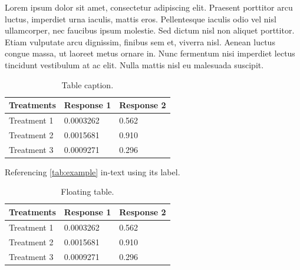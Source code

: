 \documentclass[
	11pt, %
	fleqn, %
	a4paper, %
]{LegrandOrangeBook}
\begin{document}
Lorem ipsum dolor sit amet, consectetur adipiscing elit. Praesent porttitor arcu luctus, imperdiet urna iaculis, mattis eros. Pellentesque iaculis odio vel nisl ullamcorper, nec faucibus ipsum molestie. Sed dictum nisl non aliquet porttitor. Etiam vulputate arcu dignissim, finibus sem et, viverra nisl. Aenean luctus congue massa, ut laoreet metus ornare in. Nunc fermentum nisi imperdiet lectus tincidunt vestibulum at ac elit. Nulla mattis nisl eu malesuada suscipit.

\begin{table}[H] %
	\centering %
	\begin{tabular}{L{0.15\textwidth} R{0.15\textwidth} R{0.15\textwidth}} %
		\toprule
		\textbf{Treatments} & \textbf{Response 1} & \textbf{Response 2} \\
		\midrule
		Treatment 1         & 0.0003262           & 0.562               \\
		Treatment 2         & 0.0015681           & 0.910               \\
		Treatment 3         & 0.0009271           & 0.296               \\
		\bottomrule
	\end{tabular}
	\caption{Table caption.}
	\label{tab:example} %
\end{table}

Referencing \autoref{tab:example} in-text using its label.

\begin{table}[t] %
	\centering %
	\begin{tabular}{L{0.15\textwidth} R{0.15\textwidth} R{0.15\textwidth}} %
		\toprule
		\textbf{Treatments} & \textbf{Response 1} & \textbf{Response 2} \\
		\midrule
		Treatment 1         & 0.0003262           & 0.562               \\
		Treatment 2         & 0.0015681           & 0.910               \\
		Treatment 3         & 0.0009271           & 0.296               \\
		\bottomrule
	\end{tabular}
	\caption{Floating table.}
	\label{tab:floating} %
\end{table}
\end{document}

